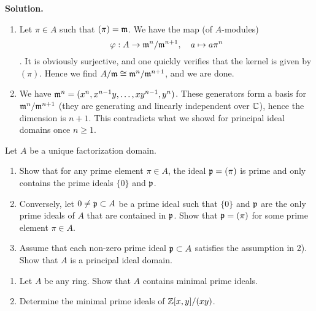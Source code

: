 \documentclass[a4paper,11pt]{article}
\begin{document}
\textbf{Solution.}
\begin{enumerate}
    \item Let $\pi \in A$ such that $(\pi) = \mathfrak{m}$. We have the map (of $A$-modules)
        $$\varphi: A \to \mathfrak{m}^n/\mathfrak{m}^{n+1}, \quad a \mapsto a \pi^n$$. 
        It is obviously surjective, and one quickly verifies that the kernel is
        given by $(\pi)$. Hence we find $A/\mathfrak{m} \cong \mathfrak{m}^n/\mathfrak{m}^{n+1}$, and we
        are done. 
    \item We have $\mathfrak{m}^n = (x^n, x^{n-1}y, \dots, xy^{n-1},y^n)$. These generators
        form a basis for $\mathfrak{m}^{n}/\mathfrak{m}^{n+1}$ (they are generating and linearly
        independent over $\mathbb{C}$), hence the dimension is $n+1$. This contradicts
        what we showd for principal ideal domains once $n \geq 1$. 
\end{enumerate}

Let $A$ be a unique factorization domain. 
\begin{enumerate}
    \item Show that for any prime element $\pi \in A$, the ideal $\mathfrak{p} = (\pi)$ is 
        prime and only contains the prime ideals $\{0\}$ and $\mathfrak{p}$.
    \item Conversely, let $0 \neq \mathfrak{p} \subset A$ be a prime ideal such that $\{0\}$
        and $\mathfrak{p}$ are the only prime ideals of $A$ that are contained in $\mathfrak{p}$. 
        Show that $\mathfrak{p} = (\pi)$ for some prime element $\pi \in A$. 
    \item Assume that each non-zero prime ideal $\mathfrak{p} \subset A$ satisfies the
        assumption in 2). Show that $A$ is a principal ideal domain. 
\end{enumerate}

\begin{enumerate}
    \item Let $A$ be any ring. Show that $A$ contains minimal prime ideals. 
    \item Determine the minimal prime ideals of $\mathbb{Z}[x,y]/(xy)$. 
\end{enumerate}
\contactend
\end{document}
